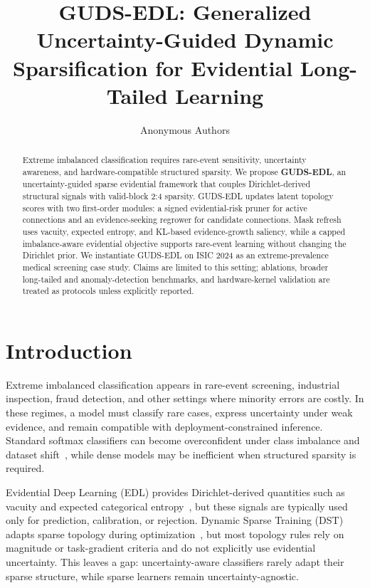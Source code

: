 \documentclass[letterpaper]{article} %
\title{GUDS-EDL: Generalized Uncertainty-Guided Dynamic Sparsification for Evidential Long-Tailed Learning}
\author{Anonymous Authors}
\begin{document}
\maketitle

\begin{abstract}
Extreme imbalanced classification requires rare-event sensitivity, uncertainty awareness, and hardware-compatible structured sparsity. We propose \textbf{GUDS-EDL}, an uncertainty-guided sparse evidential framework that couples Dirichlet-derived structural signals with valid-block 2:4 sparsity. GUDS-EDL updates latent topology scores with two first-order modules: a signed evidential-risk pruner for active connections and an evidence-seeking regrower for candidate connections. Mask refresh uses vacuity, expected entropy, and KL-based evidence-growth saliency, while a capped imbalance-aware evidential objective supports rare-event learning without changing the Dirichlet prior. We instantiate GUDS-EDL on ISIC 2024 as an extreme-prevalence medical screening case study. Claims are limited to this setting; ablations, broader long-tailed and anomaly-detection benchmarks, and hardware-kernel validation are treated as protocols unless explicitly reported.
\end{abstract}

\section{Introduction}
Extreme imbalanced classification appears in rare-event screening, industrial inspection, fraud detection, and other settings where minority errors are costly. In these regimes, a model must classify rare cases, express uncertainty under weak evidence, and remain compatible with deployment-constrained inference. Standard softmax classifiers can become overconfident under class imbalance and dataset shift~\cite{guo2017calibration}, while dense models may be inefficient when structured sparsity is required.

Evidential Deep Learning (EDL) provides Dirichlet-derived quantities such as vacuity and expected categorical entropy~\cite{sensoy2018evidential,malinin2018predictive}, but these signals are typically used only for prediction, calibration, or rejection. Dynamic Sparse Training (DST) adapts sparse topology during optimization~\cite{evci2020rigging}, but most topology rules rely on magnitude or task-gradient criteria and do not explicitly use evidential uncertainty. This leaves a gap: uncertainty-aware classifiers rarely adapt their sparse structure, while sparse learners remain uncertainty-agnostic.
\end{document}
